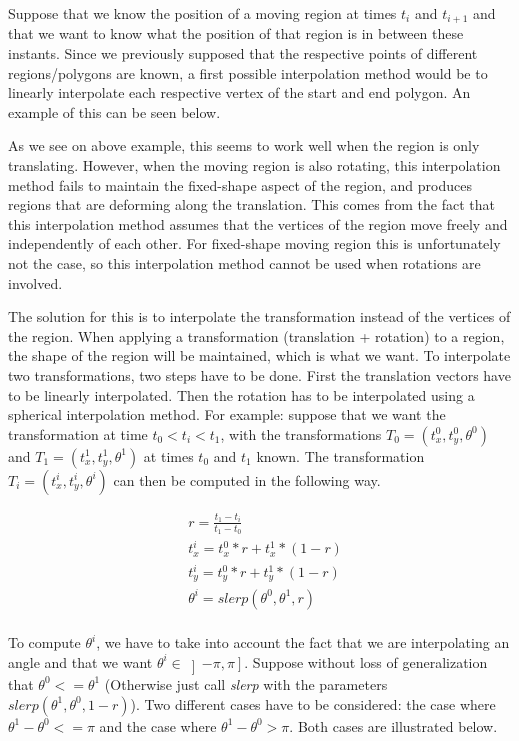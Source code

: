 		Suppose that we know the position of a moving region at times \( t_i \) and \( t_{i+1} \) and that we want to know what the position of that region is in between these instants. Since we previously supposed that the respective points of different regions/polygons are known, a first possible interpolation method would be to linearly interpolate each respective vertex of the start and end polygon. An example of this can be seen below. 

		As we see on above example, this seems to work well when the region is only translating. However, when the moving region is also rotating, this interpolation method fails to maintain the fixed-shape aspect of the region, and produces regions that are deforming along the translation. This comes from the fact that this interpolation method assumes that the vertices of the region move freely and independently of each other. For fixed-shape moving region this is unfortunately not the case, so this interpolation method cannot be used when rotations are involved. 

		The solution for this is to interpolate the transformation instead of the vertices of the region. When applying a transformation (translation + rotation) to a region, the shape of the region will be maintained, which is what we want. To interpolate two transformations, two steps have to be done. First the translation vectors have to be linearly interpolated. Then the rotation has to be interpolated using a spherical interpolation method. For example: suppose that we want the transformation at time \( t_0 < t_i < t_1 \), with the transformations \( T_0 = (t_x^0, t_y^0, \theta^0) \) and \( T_1 = (t_x^1, t_y^1, \theta^1) \) at times \( t_0 \) and \( t_1 \) known. The transformation \( T_i = (t_x^i, t_y^i, \theta^i) \) can then be computed in the following way.

		\begin{equation}
		\begin{split}
			& r = \frac{t_1 - t_i}{t_1 - t_0} \\
			& t_x^i = t_x^0 * r + t_x^1 * (1-r) \\
			& t_y^i = t_y^0 * r + t_y^1 * (1-r) \\	
			& \theta^i = slerp(\theta^0, \theta^1, r) \\
		\end{split}
		\end{equation}

		To compute \( \theta^i \), we have to take into account the fact that we are interpolating an angle and that we want \( \theta^i \in \left ] - \pi , \pi \right ] \). Suppose without loss of generalization that \( \theta^0 <= \theta^1 \) (Otherwise just call \textit{slerp} with the parameters \( slerp(\theta^1, \theta^0, 1-r) \)). Two different cases have to be considered: the case where \( \theta^1 - \theta^0 <= \pi \) and the case where \( \theta^1 - \theta^0 > \pi \). Both cases are illustrated below.
		
